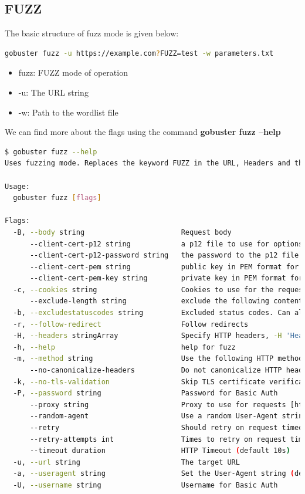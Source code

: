 \documentclass[12 pt]{article}
\begin{document}
\subsection{FUZZ}
The basic structure of fuzz mode is given below:
\begin{lstlisting}[language=bash]
gobuster fuzz -u https://example.com?FUZZ=test -w parameters.txt
\end{lstlisting}
\begin{itemize}
    \item fuzz: FUZZ mode of operation
    \item -u: The URL string
    \item -w: Path to the wordlist file 
\end{itemize}
We can find more about the flags using the command \textbf{gobuster fuzz --help}
\begin{lstlisting}[language=bash]
$ gobuster fuzz --help                                                                                                                                                 
Uses fuzzing mode. Replaces the keyword FUZZ in the URL, Headers and the request body

Usage:
  gobuster fuzz [flags]

Flags:
  -B, --body string                       Request body
      --client-cert-p12 string            a p12 file to use for options TLS client certificates
      --client-cert-p12-password string   the password to the p12 file
      --client-cert-pem string            public key in PEM format for optional TLS client certificates
      --client-cert-pem-key string        private key in PEM format for optional TLS client certificates (this key needs to have no password)
  -c, --cookies string                    Cookies to use for the requests
      --exclude-length string             exclude the following content lengths (completely ignores the status). You can separate multiple lengths by comma and it also supports ranges like 203-206
  -b, --excludestatuscodes string         Excluded status codes. Can also handle ranges like 200,300-400,404.
  -r, --follow-redirect                   Follow redirects
  -H, --headers stringArray               Specify HTTP headers, -H 'Header1: val1' -H 'Header2: val2'
  -h, --help                              help for fuzz
  -m, --method string                     Use the following HTTP method (default "GET")
      --no-canonicalize-headers           Do not canonicalize HTTP header names. If set header names are sent as is.
  -k, --no-tls-validation                 Skip TLS certificate verification
  -P, --password string                   Password for Basic Auth
      --proxy string                      Proxy to use for requests [http(s)://host:port] or [socks5://host:port]
      --random-agent                      Use a random User-Agent string
      --retry                             Should retry on request timeout
      --retry-attempts int                Times to retry on request timeout (default 3)
      --timeout duration                  HTTP Timeout (default 10s)
  -u, --url string                        The target URL
  -a, --useragent string                  Set the User-Agent string (default "gobuster/3.6")
  -U, --username string                   Username for Basic Auth


\end{lstlisting}
\end{document}
